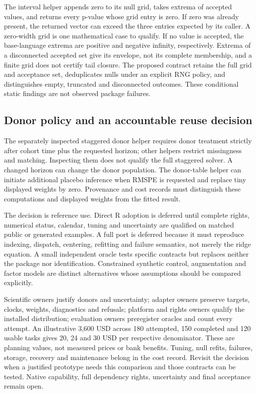 The interval helper appends zero to its null grid, takes extrema of accepted
values, and returns every p-value whose grid entry is zero. If zero was
already present, the returned vector can exceed the three entries expected
by its caller. A zero-width grid is one mathematical case to qualify. If
no value is accepted, the base-language extrema are positive and negative
infinity, respectively. Extrema of a disconnected accepted set give its
envelope, not its complete membership, and a finite grid does not certify
tail closure. The proposed contract retains the full grid and acceptance
set, deduplicates nulls under an explicit RNG policy, and distinguishes
empty, truncated and disconnected outcomes. These conditional static
findings are not observed package failures.
\citep{exec24_augsynth_source,exec24_augsynth_choice}

\subsection{Donor policy and an accountable reuse decision}
The separately inspected staggered donor helper requires donor treatment
strictly after cohort time plus the requested horizon; other helpers
restrict missingness and matching. Inspecting them does not qualify the
full staggered solver. A changed horizon can change the donor population.
The donor-table helper can initiate additional placebo inference when RMSPE
is requested and replace tiny displayed weights by zero. Provenance and
cost records must distinguish these computations and displayed weights
from the fitted result.~\citep{exec24_augsynth_source}

The decision is reference use. Direct R adoption is deferred until complete
rights, numerical status, calendar, tuning and uncertainty are qualified
on matched public or generated examples. A full port is deferred because
it must reproduce indexing, dispatch, centering, refitting and failure
semantics, not merely the ridge equation. A small independent oracle tests
specific contracts but replaces neither the package nor identification.
Constrained synthetic control, augmentation and factor models are distinct
alternatives whose assumptions should be compared explicitly.
\citep{exec24_augsynth_choice}

Scientific owners justify donors and uncertainty; adapter owners preserve
targets, clocks, weights, diagnostics and refusals; platform and rights
owners qualify the installed distribution; evaluation owners preregister
oracles and count every attempt. An illustrative 3,600 USD across 180
attempted, 150 completed and 120 usable tasks gives 20, 24 and 30 USD per
respective denominator. These are planning values, not measured prices or
bank benefits. Tuning, null refits, failures, storage, recovery and
maintenance belong in the cost record. Revisit the decision when a
justified prototype needs this comparison and those contracts can be
tested. Native capability, full dependency rights, uncertainty and final
acceptance remain open.~\citep{exec24_augsynth_choice}

